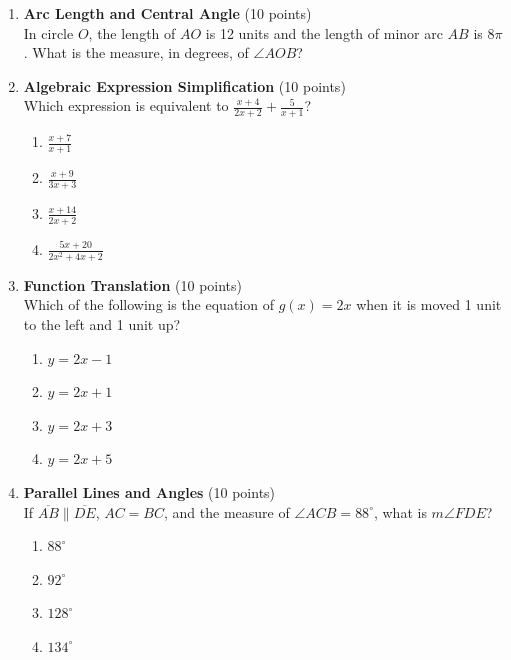 \begin{enumerate}
  \item \textbf{Arc Length and Central Angle} (10 points)\\
  In circle $O$, the length of $AO$ is 12 units and the length of minor arc $AB$ is $8\pi$. What is the measure, in degrees, of $\angle AOB$?
  \begin{subanswer}
  \end{subanswer}


  \newpage

  \item \textbf{Algebraic Expression Simplification} (10 points)\\
  Which expression is equivalent to $\frac{x+4}{2x+2}+\frac{5}{x+1}$?
  \begin{enumerate}[label=(\Alph*)]
    \item $\frac{x+7}{x+1}$
    \item $\frac{x+9}{3x+3}$
    \item $\frac{x+14}{2x+2}$
    \item $\frac{5x+20}{2x^2+4x+2}$
  \end{enumerate}
  \begin{subanswer}
  \end{subanswer}

  \item \textbf{Function Translation} (10 points)\\
  Which of the following is the equation of $g(x)=2x$ when it is moved 1 unit to the left and 1 unit up?
  \begin{enumerate}[label=(\Alph*)]
    \item $y=2x-1$
    \item $y=2x+1$
    \item $y=2x+3$
    \item $y=2x+5$
  \end{enumerate}
  \begin{subanswer}
  \end{subanswer}

  \newpage

  \item \textbf{Parallel Lines and Angles} (10 points)\\
  If $\overline{AB} \parallel \overline{DE}$, $AC=BC$, and the measure of $\angle ACB=88^\circ$, what is $m\angle FDE$?
  \begin{enumerate}[label=(\Alph*)]
    \item $88^\circ$
    \item $92^\circ$
    \item $128^\circ$
    \item $134^\circ$
  \end{enumerate}
  \begin{subanswer}
  \end{subanswer}


\end{enumerate}

